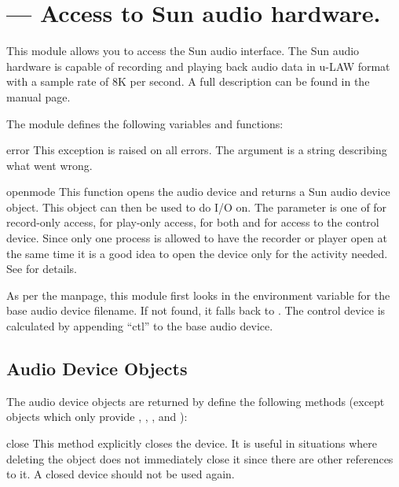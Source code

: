 \section{ ---
         Access to Sun audio hardware.}



This module allows you to access the Sun audio interface. The Sun
audio hardware is capable of recording and playing back audio data
in u-LAW format with a sample rate of 8K per second. A
full description can be found in the  manual page.

The module defines the following variables and functions:

\begin{excdesc}{error}
This exception is raised on all errors. The argument is a string
describing what went wrong.
\end{excdesc}

\begin{funcdesc}{open}{mode}
This function opens the audio device and returns a Sun audio device
object. This object can then be used to do I/O on. The  parameter
is one of  for record-only access,  for play-only
access,  for both and  for access to the
control device. Since only one process is allowed to have the recorder
or player open at the same time it is a good idea to open the device
only for the activity needed. See  for details.

As per the manpage, this module first looks in the environment
variable  for the base audio device filename.  If not
found, it falls back to .  The control device is
calculated by appending ``ctl'' to the base audio device.
\end{funcdesc}


\subsection{Audio Device Objects}
\label{audio-device-objects}

The audio device objects are returned by  define the
following methods (except  objects which only provide
, , , and
):

\begin{methoddesc}{close}{}
This method explicitly closes the device. It is useful in situations
where deleting the object does not immediately close it since there
are other references to it. A closed device should not be used again.
\end{methoddesc}

